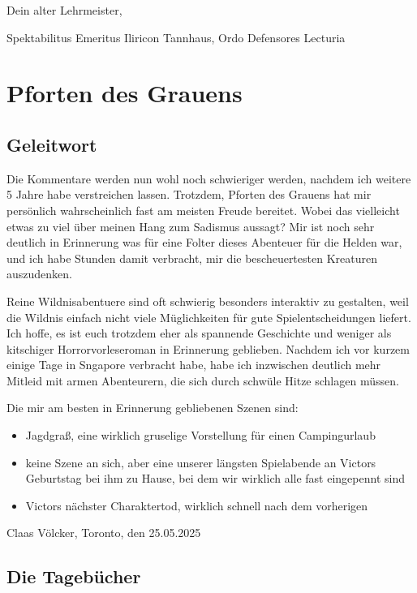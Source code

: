 Dein alter Lehrmeister,

Spektabilitus Emeritus Iliricon Tannhaus, Ordo Defensores Lecturia



\chapter{Pforten des Grauens}

\section{Geleitwort}

Die Kommentare werden nun wohl noch schwieriger werden, nachdem ich weitere 5 Jahre habe verstreichen lassen. Trotzdem, Pforten des Grauens hat mir persönlich wahrscheinlich fast am meisten Freude bereitet. Wobei das vielleicht etwas zu viel über meinen Hang zum Sadismus aussagt? Mir ist noch sehr deutlich in Erinnerung was für eine Folter dieses Abenteuer für die Helden war, und ich habe Stunden damit verbracht, mir die bescheuertesten Kreaturen auszudenken.

Reine Wildnisabentuere sind oft schwierig besonders interaktiv zu gestalten, weil die Wildnis einfach nicht viele Müglichkeiten für gute Spielentscheidungen liefert. Ich hoffe, es ist euch trotzdem eher als spannende Geschichte und weniger als kitschiger Horrorvorleseroman in Erinnerung geblieben. Nachdem ich vor kurzem einige Tage in Sngapore verbracht habe, habe ich inzwischen deutlich mehr Mitleid mit armen Abenteurern, die sich durch schwüle Hitze schlagen müssen.

Die mir am besten in Erinnerung gebliebenen Szenen sind:
\begin{itemize}
\item Jagdgraß, eine wirklich gruselige Vorstellung für einen Campingurlaub
\item keine Szene an sich, aber eine unserer längsten Spielabende an Victors Geburtstag bei ihm zu Hause, bei dem wir wirklich alle fast eingepennt sind
\item Victors nächster Charaktertod, wirklich schnell nach dem vorherigen
\end{itemize}


\begin{flushright}
Claas Völcker, Toronto, den 25.05.2025
\end{flushright}


\section{Die Tagebücher}

